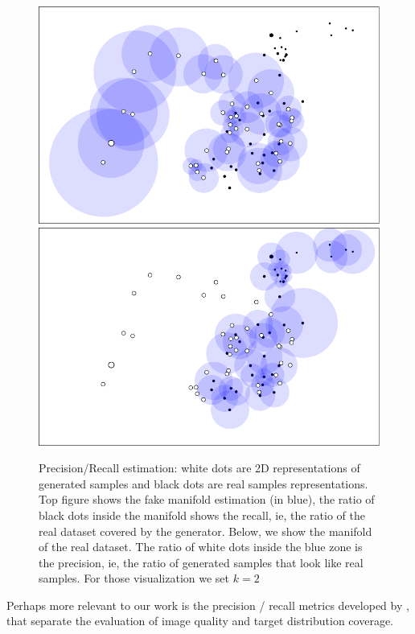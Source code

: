 \begin{figure}[!h]
    \centering
    \includegraphics{60-files/precision-gan.pdf}
    \includegraphics{60-files/recall-gan.pdf}
    \caption{Precision/Recall estimation: white dots are 2D representations of generated samples and black dots are real samples representations. Top figure shows the fake manifold estimation (in blue), the ratio of black dots inside the manifold shows the recall, ie, the ratio of the real dataset covered by the generator. Below, we show the manifold of the real dataset. The ratio of white dots inside the blue zone is the precision, ie, the ratio of generated samples that look like real samples. For those visualization we set $k=2$}
    \label{fig:precision-recall}
\end{figure}


Perhaps more relevant to our work is the precision / recall metrics developed by \cite{precisionrecall}, that separate the evaluation of image quality and target distribution coverage.

